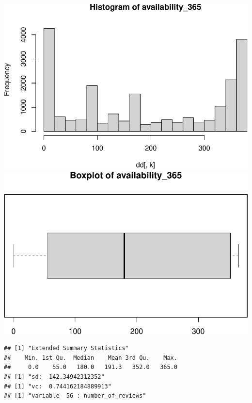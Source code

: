 \includegraphics{anal_files/figure-latex/unnamed-chunk-7-38.pdf}
\includegraphics{anal_files/figure-latex/unnamed-chunk-7-39.pdf}

\begin{verbatim}
## [1] "Extended Summary Statistics"
##    Min. 1st Qu.  Median    Mean 3rd Qu.    Max. 
##     0.0    55.0   180.0   191.3   352.0   365.0 
## [1] "sd:  142.34942312352"
## [1] "vc:  0.744162184889913"
## [1] "variable  56 : number_of_reviews"
\end{verbatim}

